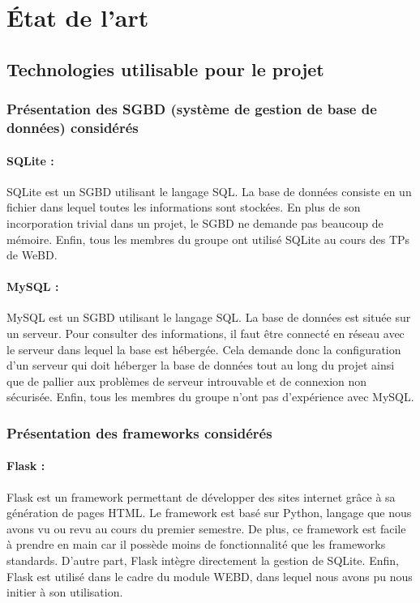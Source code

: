 \chapter{État de l'art}


\section{Technologies utilisable pour le projet }
 \minitoc
\subsection{Présentation des SGBD (système de gestion de base de données) considérés}

\subsubsection{SQLite :} 

SQLite est un SGBD utilisant le langage SQL.
La base de données consiste en un fichier dans lequel toutes les informations sont stockées.
En plus de son incorporation trivial dans un projet, le SGBD ne demande pas beaucoup de mémoire.
Enfin, tous les membres du groupe ont utilisé SQLite au cours des TPs de WeBD.
\cite{SQLite-wiki} \cite{sqlite}

\subsubsection{MySQL :}

MySQL est un SGBD utilisant le langage SQL.
La base de données est située sur un serveur. Pour consulter des informations, il faut être connecté en réseau avec le serveur dans lequel la base est hébergée.
Cela demande donc la configuration d’un serveur qui doit héberger la base de données tout au long du projet ainsi que de pallier aux problèmes de serveur introuvable et de connexion non sécurisée.
Enfin, tous les membres du groupe n'ont pas d’expérience avec MySQL.
\cite{MySQL-wiki}


\subsection{Présentation des frameworks considérés}

\subsubsection{Flask :} 

Flask est un framework permettant de développer des sites internet grâce à sa génération de pages HTML.
Le framework est basé sur Python, langage que nous avons vu ou revu au cours du premier semestre. De plus, ce framework est facile à prendre en main car il possède moins de fonctionnalité que les frameworks standards.
D’autre part, Flask intègre directement la gestion de SQLite.
Enfin, Flask est utilisé dans le cadre du module WEBD, dans lequel nous avons pu nous initier à son utilisation.
\cite{Flask}


